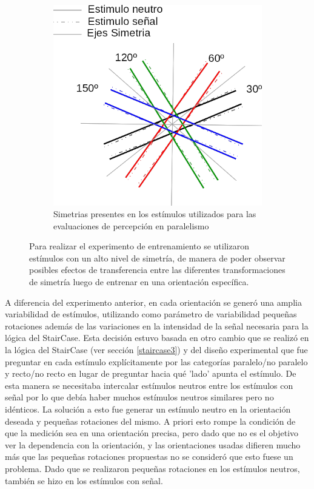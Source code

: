 \documentclass{article}
\numberwithin{figure}{section}
\begin{document}
\begin{figure}
\begin{subfigure}{.53\textwidth}
            \includegraphics[width=\textwidth]{Imagenes/SimetriasOrientacionParalelismo.png}
            \caption{Simetrias presentes en los estímulos utilizados para las evaluaciones de percepción en paralelismo}
        \end{subfigure}
        \caption{Para realizar el experimento de entrenamiento se utilizaron estímulos con un alto nivel de simetría, de manera de poder observar posibles efectos de transferencia entre las diferentes transformaciones de simetría luego de entrenar en una orientación específica.}
        \label{fig:simetrias}
    \end{figure}

    A diferencia del experimento anterior, en cada orientación se generó una amplia variabilidad de estímulos, utilizando como parámetro de variabilidad pequeñas rotaciones además de las variaciones en la intensidad de la señal necesaria para la lógica del StairCase. Esta decisión estuvo basada en otro cambio que se realizó en la lógica del StairCase (ver sección \ref{staircase3}) y del diseño experimental que fue preguntar en cada estímulo explícitamente por las categorías paralelo/no paralelo y recto/no recto en lugar de preguntar hacia qué 'lado' apunta el estímulo. De esta manera  se necesitaba intercalar estímulos neutros entre los estímulos con señal por lo que debía haber muchos estímulos neutros similares pero no idénticos. La solución a esto fue generar un estímulo neutro en la orientación deseada y pequeñas rotaciones del mismo. A priori esto rompe la condición de que la medición sea en una orientación precisa, pero dado que no es el objetivo ver la dependencia con la orientación, y las orientaciones usadas difieren mucho más que las pequeñas rotaciones propuestas no se consideró que esto fuese un problema. Dado que se realizaron pequeñas rotaciones en los estímulos neutros, también se hizo en los estímulos con señal.
    
\end{document}
